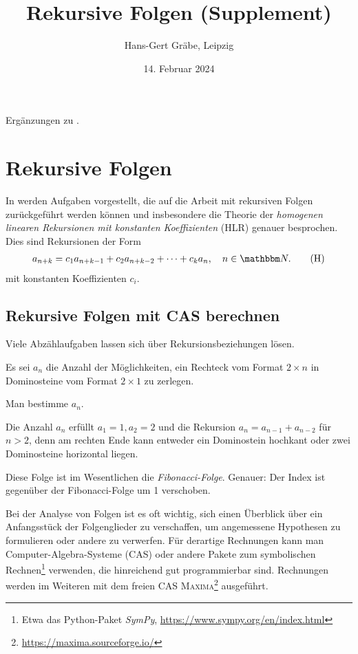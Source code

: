 \documentclass[11pt,a4paper]{article}
\title{Rekursive Folgen (Supplement)\kosemnetlicensemark}
\author{Hans-Gert Gräbe, Leipzig}
\date{14. Februar 2024}
\newcommand{\cas}[1]{\textsc{#1}}
\begin{document}
\maketitle

Ergänzungen zu \cite{b-schueler}.

\section{Rekursive Folgen}

In \cite{b-schueler} werden Aufgaben vorgestellt, die auf die Arbeit mit
rekursiven Folgen zurückgeführt werden können und insbesondere die Theorie der
\emph{homogenen linearen Rekursionen mit konstanten Koeffizienten} (HLR)
genauer besprochen.  Dies sind Rekursionen der Form
\begin{align*}\label{e-linrek}
a_{n+k}=c_1 a_{n+k-1} +c_2 a_{n+k-2} +\cdots + c_k a_n,\quad n\in \N.\tag{H}
\end{align*}
mit konstanten Koeffizienten $c_i$. 

\subsection{Rekursive Folgen mit CAS berechnen}

Viele Abzählaufgaben lassen sich über Rekursionsbeziehungen lösen.

\begin{aufgabe}
Es sei $a_n$ die Anzahl der Möglichkeiten, ein Rechteck vom Format $2\times n$
in Dominosteine vom Format $2\times 1$ zu zerlegen.

Man bestimme $a_n$.
\end{aufgabe}

\begin{loesung}
  Die Anzahl $a_n$ erfüllt $a_1=1, a_2=2$ und die Rekursion
  $a_n=a_{n-1}+a_{n-2}$ für $n>2$, denn am rechten Ende kann entweder ein
  Dominostein hochkant oder zwei Dominosteine horizontal liegen. 
\end{loesung}

Diese Folge ist im Wesentlichen die \emph{Fibonacci-Folge}. Genauer: Der Index
ist gegenüber der Fibonacci-Folge um 1 verschoben.

Bei der Analyse von Folgen ist es oft wichtig, sich einen Überblick über ein
Anfangsstück der Folgenglieder zu verschaffen, um angemessene Hypothesen zu
formulieren oder andere zu verwerfen.  Für derartige Rechnungen kann man
Computer-Algebra-Systeme (CAS) oder andere Pakete zum symbolischen
Rechnen\footnote{Etwa das Python-Paket \emph{SymPy},
\url{https://www.sympy.org/en/index.html} } verwenden, die hinreichend gut
programmierbar sind.  Rechnungen werden im Weiteren mit dem freien CAS
\cas{Maxima}\footnote{\url{https://maxima.sourceforge.io/}} ausgeführt.
\end{document}
